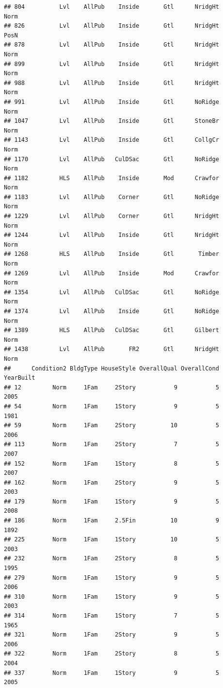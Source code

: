 \documentclass[]{article}
\begin{document}
\begin{verbatim}
## 804          Lvl    AllPub    Inside       Gtl      NridgHt       Norm
## 826          Lvl    AllPub    Inside       Gtl      NridgHt       PosN
## 878          Lvl    AllPub    Inside       Gtl      NridgHt       Norm
## 899          Lvl    AllPub    Inside       Gtl      NridgHt       Norm
## 988          Lvl    AllPub    Inside       Gtl      NridgHt       Norm
## 991          Lvl    AllPub    Inside       Gtl      NoRidge       Norm
## 1047         Lvl    AllPub    Inside       Gtl      StoneBr       Norm
## 1143         Lvl    AllPub    Inside       Gtl      CollgCr       Norm
## 1170         Lvl    AllPub   CulDSac       Gtl      NoRidge       Norm
## 1182         HLS    AllPub    Inside       Mod      Crawfor       Norm
## 1183         Lvl    AllPub    Corner       Gtl      NoRidge       Norm
## 1229         Lvl    AllPub    Corner       Gtl      NridgHt       Norm
## 1244         Lvl    AllPub    Inside       Gtl      NridgHt       Norm
## 1268         HLS    AllPub    Inside       Gtl       Timber       Norm
## 1269         Lvl    AllPub    Inside       Mod      Crawfor       Norm
## 1354         Lvl    AllPub   CulDSac       Gtl      NoRidge       Norm
## 1374         Lvl    AllPub    Inside       Gtl      NoRidge       Norm
## 1389         HLS    AllPub   CulDSac       Gtl      Gilbert       Norm
## 1438         Lvl    AllPub       FR2       Gtl      NridgHt       Norm
##      Condition2 BldgType HouseStyle OverallQual OverallCond YearBuilt
## 12         Norm     1Fam     2Story           9           5      2005
## 54         Norm     1Fam     1Story           9           5      1981
## 59         Norm     1Fam     2Story          10           5      2006
## 113        Norm     1Fam     2Story           7           5      2007
## 152        Norm     1Fam     1Story           8           5      2007
## 162        Norm     1Fam     2Story           9           5      2003
## 179        Norm     1Fam     1Story           9           5      2008
## 186        Norm     1Fam     2.5Fin          10           9      1892
## 225        Norm     1Fam     1Story          10           5      2003
## 232        Norm     1Fam     2Story           8           5      1995
## 279        Norm     1Fam     1Story           9           5      2006
## 310        Norm     1Fam     1Story           9           5      2003
## 314        Norm     1Fam     1Story           7           5      1965
## 321        Norm     1Fam     2Story           9           5      2006
## 322        Norm     1Fam     2Story           8           5      2004
## 337        Norm     1Fam     1Story           9           5      2005

\end{verbatim}
\end{document}
